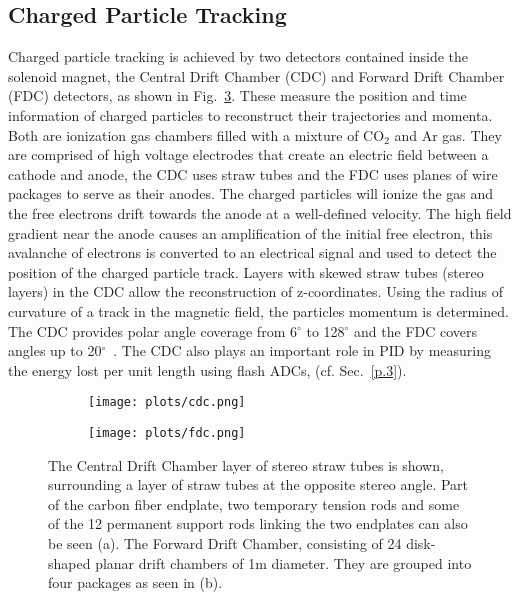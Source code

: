 {\subsection{Charged Particle Tracking}
\label{p.2.2.2}

Charged particle tracking is achieved by two detectors contained inside the solenoid magnet, the Central Drift Chamber (CDC) and Forward Drift Chamber (FDC) detectors, as shown in Fig.~\ref{fig.2.2.2}. These measure the position and time information of charged particles to reconstruct their trajectories and momenta. Both are ionization gas chambers filled with a mixture of CO$_2$ and Ar gas. They are comprised of high voltage electrodes that create an electric field between a cathode and anode, the CDC uses straw tubes and the FDC uses planes of wire packages to serve as their anodes. The charged particles will ionize the gas and the free electrons drift towards the anode at a well-defined velocity. The high field gradient near the anode causes an amplification of the initial free electron, this avalanche of electrons is converted to an electrical signal and used to detect the position of the charged particle track. Layers with skewed straw tubes (stereo layers) in the CDC allow the reconstruction of z-coordinates. Using the radius of curvature of a track in the magnetic field, the particles momentum is determined. The CDC provides polar angle coverage from 6$^{\circ}$ to 128$^{\circ}$ and the FDC covers angles up to 20$^{\circ}$~\cite{GlueX97}. The CDC also plays an important role in PID by measuring the energy lost per unit length using flash ADCs, (cf. Sec.~\ref{p.3}).

\begin{figure}[H]
    \centering
    \begin{subfigure}[b]{0.6\textwidth}
        \texttt{[image: plots/cdc.png]}
        \caption{}
        \label{fig.2.2.2.a}
    \end{subfigure}
    \begin{subfigure}[b]{0.6\textwidth}
        \texttt{[image: plots/fdc.png]}
        \caption{}
        \label{fig.2.2.2.b}
    \end{subfigure}
    \caption{The Central Drift Chamber layer of stereo straw tubes is shown, surrounding a layer of straw tubes at the opposite stereo angle. Part of the carbon fiber endplate, two temporary tension rods and some of the 12 permanent support rods linking the two endplates can also be seen (a). The Forward Drift Chamber, consisting of 24 disk-shaped planar drift chambers of 1m diameter. They are grouped into four packages as seen in (b).}
    \label{fig.2.2.2}
\end{figure}

}
